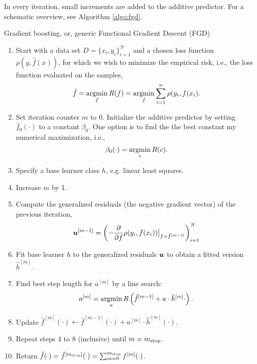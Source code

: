 In every iteration, small increments are added to the additive predictor.
For a schematic overview, see Algorithm \ref{algo:fgd}.
\begin{algorithm}
\caption{Gradient boosting, or, generic Functional Gradient Descent (FGD)}
\label{algo:fgd}
\begin{enumerate}
    \item Start with a data set $D=\{x_i, y_i\}_{i=1}^N$ and a chosen loss function $\rho(y,\hat{f}(x))$, for which we wish to
        minimize the empirical risk, i.e., the loss function evaluated on the samples,
        \begin{equation*}
            \hat{f}=\operatorname*{argmin}_{f}R(f)=\operatorname*{argmin}_{f}\sum_{i=1}^n\rho(y_{i},f(x_{i}).
        \end{equation*}
    \item Set iteration counter $m$ to 0. Initialize the additive predictor by setting $\hat{f}_0(\cdot)$ to a constant $\beta_0$. One option is to find the the best constant my numerical maximization, i.e.,
        \begin{equation*}
            \beta_0(\cdot)=\operatorname*{argmin}_c R(c).
        \end{equation*}
    \item Specify a base learner class $h$, e.g. linear least squares.
    \item Increase $m$ by 1.
    \item Compute the generalized residuals (the negative gradient vector) of the previous iteration,
        \begin{equation*}
            \bm{u}^{[m-1]}=\left(-\frac{\partial}{\partial f}\rho(y_i, f(x_i))\big\rvert_{f=\hat{f}^{[m-1]}}\right)_{i=1}^N
        \end{equation*}
    \item Fit base learner $h$ to the generalized residuals $\bm{u}$ to obtain a fitted version $\hat{h}^{[m]}$.
    \item Find best step length for $a^{[m]}$ by a line search:
        \begin{equation*}
            a^{[m]}=\operatorname*{argmin}_{a}R\left(\hat{f}^{[m-1]}+a\cdot\hat{h}^{[m]}{\cdot}\right).
        \end{equation*}
    \item Update $\hat{f}^{[m]}(\cdot)\gets \hat{f}^{[m-1]}(\cdot)+a^{[m]}\cdot \hat{h}^{[m]}(\cdot)$.
    \item Repeat steps 4 to 8 (inclusive) until $m=m_{\text{stop}}$.
    \item Return $\hat{f}(\cdot)=\hat{f}^{[m_{\text{stop}}]}(\cdot)=\sum_{m=0}^{m_{\text{stop}}}f^{[m]}(\cdot)$.
\end{enumerate}
\end{algorithm}

